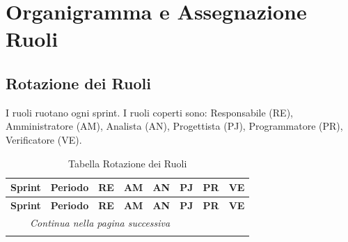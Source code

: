 \section{Organigramma e Assegnazione Ruoli}

\subsection{Rotazione dei Ruoli}
\label{sec:rotazione}
I ruoli ruotano ogni sprint. I ruoli coperti sono: Responsabile (RE),
Amministratore (AM), Analista (AN), Progettista (PJ), Programmatore (PR),
Verificatore (VE).

\begin{longtable}{|cp{1.7cm}|p{1.7cm}|p{1.7cm}|p{1.7cm}|p{1.7cm}|p{1.7cm}|p{1.7cm}|}
    \caption{Tabella Rotazione dei Ruoli} \\
    \hline
    \textbf{Sprint} & \textbf{Periodo} &
    \textbf{RE} & \textbf{AM} & \textbf{AN} &
    \textbf{PJ} & \textbf{PR} & \textbf{VE} \\
    \hline
    \endfirsthead
    \hline
    \textbf{Sprint} & \textbf{Periodo} &
    \textbf{RE} & \textbf{AM} & \textbf{AN} &
    \textbf{PJ} & \textbf{PR} & \textbf{VE} \\
    \hline
    \endhead

    \hline
    \multicolumn{5}{r}{\textit{Continua nella pagina successiva}} \\
    \hline
    \endfoot

    \hline
    \endlastfoot


\end{longtable}

